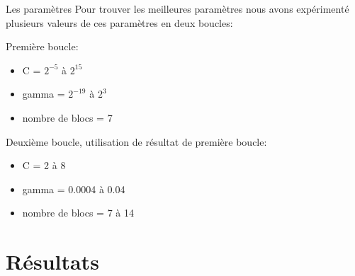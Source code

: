 \documentclass[12pt]{beamer}
\begin{document}
\begin{frame}{Les paramètres}
  Pour trouver les meilleures paramètres nous avons expérimenté plusieurs valeurs de ces 
paramètres en deux boucles:

Première boucle:
  \begin{itemize}
   \item C = $2^{-5}$ à $2^{15}$
   \item gamma = $2^{-19}$ à $2^3$
   \item nombre de blocs = 7
  \end{itemize}
Deuxième boucle, utilisation de résultat de première boucle:
  \begin{itemize}
   \item C = 2 à 8
   \item gamma = 0.0004 à 0.04
   \item nombre de blocs = 7 à 14
  \end{itemize}

\end{frame}

\section{Résultats}
\end{document}
